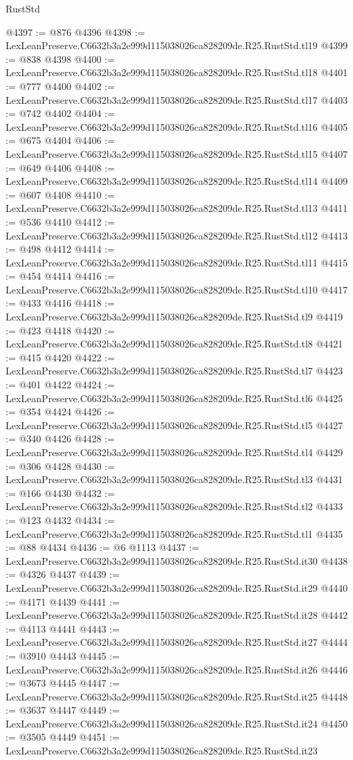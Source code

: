 \begin{lexlean}{RustStd}
\begin{coremodule}
@4397 := @876 @4396
@4398 := LexLeanPreserve.C6632b3a2e999d115038026ca828209de.R25.RustStd.tl19
@4399 := @838 @4398
@4400 := LexLeanPreserve.C6632b3a2e999d115038026ca828209de.R25.RustStd.tl18
@4401 := @777 @4400
@4402 := LexLeanPreserve.C6632b3a2e999d115038026ca828209de.R25.RustStd.tl17
@4403 := @742 @4402
@4404 := LexLeanPreserve.C6632b3a2e999d115038026ca828209de.R25.RustStd.tl16
@4405 := @675 @4404
@4406 := LexLeanPreserve.C6632b3a2e999d115038026ca828209de.R25.RustStd.tl15
@4407 := @649 @4406
@4408 := LexLeanPreserve.C6632b3a2e999d115038026ca828209de.R25.RustStd.tl14
@4409 := @607 @4408
@4410 := LexLeanPreserve.C6632b3a2e999d115038026ca828209de.R25.RustStd.tl13
@4411 := @536 @4410
@4412 := LexLeanPreserve.C6632b3a2e999d115038026ca828209de.R25.RustStd.tl12
@4413 := @498 @4412
@4414 := LexLeanPreserve.C6632b3a2e999d115038026ca828209de.R25.RustStd.tl11
@4415 := @454 @4414
@4416 := LexLeanPreserve.C6632b3a2e999d115038026ca828209de.R25.RustStd.tl10
@4417 := @433 @4416
@4418 := LexLeanPreserve.C6632b3a2e999d115038026ca828209de.R25.RustStd.tl9
@4419 := @423 @4418
@4420 := LexLeanPreserve.C6632b3a2e999d115038026ca828209de.R25.RustStd.tl8
@4421 := @415 @4420
@4422 := LexLeanPreserve.C6632b3a2e999d115038026ca828209de.R25.RustStd.tl7
@4423 := @401 @4422
@4424 := LexLeanPreserve.C6632b3a2e999d115038026ca828209de.R25.RustStd.tl6
@4425 := @354 @4424
@4426 := LexLeanPreserve.C6632b3a2e999d115038026ca828209de.R25.RustStd.tl5
@4427 := @340 @4426
@4428 := LexLeanPreserve.C6632b3a2e999d115038026ca828209de.R25.RustStd.tl4
@4429 := @306 @4428
@4430 := LexLeanPreserve.C6632b3a2e999d115038026ca828209de.R25.RustStd.tl3
@4431 := @166 @4430
@4432 := LexLeanPreserve.C6632b3a2e999d115038026ca828209de.R25.RustStd.tl2
@4433 := @123 @4432
@4434 := LexLeanPreserve.C6632b3a2e999d115038026ca828209de.R25.RustStd.tl1
@4435 := @88 @4434
@4436 := @6 @1113
@4437 := LexLeanPreserve.C6632b3a2e999d115038026ca828209de.R25.RustStd.it30
@4438 := @4326 @4437
@4439 := LexLeanPreserve.C6632b3a2e999d115038026ca828209de.R25.RustStd.it29
@4440 := @4171 @4439
@4441 := LexLeanPreserve.C6632b3a2e999d115038026ca828209de.R25.RustStd.it28
@4442 := @4113 @4441
@4443 := LexLeanPreserve.C6632b3a2e999d115038026ca828209de.R25.RustStd.it27
@4444 := @3910 @4443
@4445 := LexLeanPreserve.C6632b3a2e999d115038026ca828209de.R25.RustStd.it26
@4446 := @3673 @4445
@4447 := LexLeanPreserve.C6632b3a2e999d115038026ca828209de.R25.RustStd.it25
@4448 := @3637 @4447
@4449 := LexLeanPreserve.C6632b3a2e999d115038026ca828209de.R25.RustStd.it24
@4450 := @3505 @4449
@4451 := LexLeanPreserve.C6632b3a2e999d115038026ca828209de.R25.RustStd.it23

\end{coremodule}
\end{lexlean}
